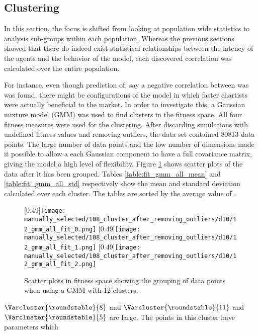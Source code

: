 \subsection{Clustering}
In this section, the focus is shifted from looking at population wide statistics to analysis sub-groups within each population. Whereas the previous sections showed that there do indeed exist statistical relationships between the latency of the agents and the behavior of the model, each discovered correlation was calculated over the entire population. 

For instance, even though prediction of, say a negative correlation between \timetoreachnewfundamental was \sclatencymu was found, there might be configurations of the model in which faster chartists were actually beneficial to the market. In order to investigate this, a Gaussian mixture model (GMM) was used to find clusters in the fitness space. All four fitness measures were used for the clustering. After discarding simulations with undefined fitness values and removing outliers, the data set contained 80813 data points. The large number of data points and the low number of dimensions made it possible to allow a each Gaussian component to have a full covariance matrix, giving the model a high level of flexibility. Figure \ref{fig:d10_scatter_clusters} shows scatter plots of the data after it has been grouped. Tables \ref{table:fit_gmm_all_mean} and \ref{table:fit_gmm_all_std} respectively show the mean and standard deviation calculated over each cluster. The tables are sorted by the average value of \overshoot.



\begin{figure}
	\centering
	\subcaptionbox{}[0.49\linewidth]{\texttt{[image: manually\_selected/108\_cluster\_after\_removing\_outliers/d10/12\_gmm\_all\_fit\_0.png]}}
	\subcaptionbox{}[0.49\linewidth]{\texttt{[image: manually\_selected/108\_cluster\_after\_removing\_outliers/d10/12\_gmm\_all\_fit\_1.png]}}
	\subcaptionbox{}[0.49\linewidth]{\texttt{[image: manually\_selected/108\_cluster\_after\_removing\_outliers/d10/12\_gmm\_all\_fit\_2.png]}}
	\caption{Scatter plots in fitness space showing the grouping of data points when using a GMM with 12 clusters.}
	\label{fig:d10_scatter_clusters}
\end{figure}


$\Varcluster{\roundstable}{8}$ and $\Varcluster{\roundstable}{11}$ and $\Varcluster{\roundstable}{5}$ are large. The points in this cluster have parameters which 



